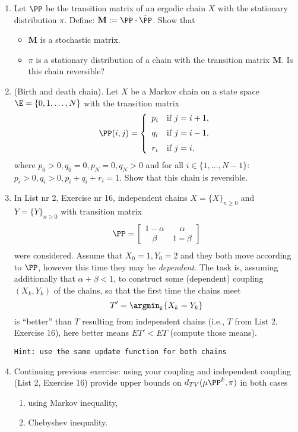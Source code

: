 \documentclass[a4paper,12pt]{article}
\begin{document}
\begin{enumerate}
\item 

Let $\PP$ be the transition matrix of an ergodic chain $X$ with the stationary distribution $\pi$.
 Define:  $\mathbf{M}:=\PP\cdot \tilde{\PP}$. Show that
\begin{itemize}
\item $\mathbf{M}$ is a stochastic matrix.
 \item $\pi$ is a stationary distribution of a chain with the transition matrix $\mathbf{M}$.  
 Is this chain reversible?

\end{itemize}


\item 
(Birth and death chain).
Let $X$ be  a Markov chain on a state space  $\E=\{0,1,\ldots,N\}$ with the transition matrix
$$\PP(i,j)=\left\{
\begin{array}{clll}
p_i & \textrm{if } j=i+1, \\[6pt]
q_i & \textrm{if } j=i-1, \\[6pt]
r_i & \textrm{if } j=i,
\end{array}
\right.
$$
where  $p_0>0, q_0=0, p_N=0, q_N>0$ and for all $i\in\{1,\ldots,N-1\}$: $p_i>0, q_i>0, p_i+q_i+r_i=1$.
Show that this chain is reversible. 
  
  
  \item In List nr 2, Exercise nr 16, independent chains $X=\{X\}_{n\geq 0}$ and $Y=\{Y\}_{n\geq 0}$  with transition matrix
$$\PP=\left[
\begin{array}{ccccccccc}
1-\alpha & \alpha \\
\beta & 1-\beta \\
\end{array}\right]$$
were considered. 
Assume that  $X_0=1, Y_0=2$ and they both move according to $\PP$, however this time 
they may be \textsl{dependent}. The task is, assuming additionally that $\alpha+\beta<1$,
to construct some (dependent) coupling $(X_k, Y_k)$ of the chains, so that the first time the chains meet 
$$T'=\argmin_k\{X_k=Y_k\}$$
is ``better'' than $T$ resulting from independent chains (i.e., $T$ from List 2, Exercise 16),
here better means $ET'<ET$ (compute those means). 
\begin{flushright}
 \tiny{\texttt{Hint: use the same update function for both chains}}
\end{flushright}

\item Continuing previous exercise: using your coupling and independent coupling (List 2, Exercise 16) provide upper bounds 
on $d_{TV}(\mu\PP^k,\pi)$ in both cases
\begin{enumerate}
 \item using Markov inequality,
 \item Chebyshev inequality.
\end{enumerate}






 

\end{enumerate}
 
\end{document}
